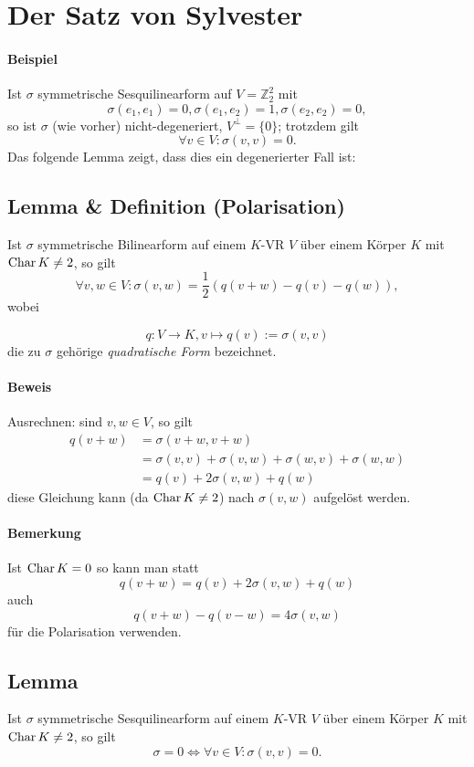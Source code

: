 \section{Der Satz von Sylvester}
\paragraph{Beispiel}
	Ist $ \sigma $ symmetrische Sesquilinearform auf $ V=\mathbb{Z}^2_2 $ mit
		\[ \sigma(e_1,e_1)=0, \sigma(e_1,e_2) = 1, \sigma(e_2,e_2) = 0, \]
	so ist $ \sigma $ (wie vorher) nicht-degeneriert, $ V^\perp =\{0\}$; trotzdem gilt
		\[ \forall v\in V: \sigma(v,v) = 0. \]
	Das folgende Lemma zeigt, dass dies ein degenerierter Fall ist:
	
\subsection{Lemma \& Definition (Polarisation)}
\begin{Lemma}[Polarisationslemma]	
	Ist $ \sigma $ symmetrische Bilinearform auf einem $ K $-VR $ V $ über einem Körper $ K $ mit $ \operatorname{Char} K \neq 2 $, so gilt
		\[ \forall v,w\in V: \sigma(v,w)=\frac{1}{2}\left(q(v+w)-q(v)-q(w)\right), \]
	wobei
\end{Lemma}
\begin{Definition}
		\[ q:V\to K, v\mapsto q(v):= \sigma(v,v) \]
	die zu $ \sigma $ gehörige \emph{quadratische Form} bezeichnet.
\end{Definition}
\paragraph{Beweis}
	Ausrechnen: sind $ v,w\in V $, so gilt
	\begin{align*}
	q(v+w) &= \sigma(v+w,v+w)\\
			&= \sigma(v,v) + \sigma(v,w)+\sigma(w,v)+\sigma(w,w)\\
			&= q(v)+2\sigma(v,w)+q(w)
	\end{align*}
	diese Gleichung kann (da $ \operatorname{Char} K\neq 2 $) nach $ \sigma(v,w) $ aufgelöst werden.
\paragraph{Bemerkung}
	Ist $ \operatorname{Char} K=0 $ so kann man statt
		\[ q(v+w)=q(v)+2\sigma(v,w)+q(w) \]
	auch
		\[ q(v+w)-q(v-w) = 4 \sigma(v,w) \]
	für die Polarisation verwenden.
	
\subsection{Lemma}
\begin{Lemma}[]
	Ist $ \sigma $ symmetrische Sesquilinearform auf einem $ K $-VR $ V $ über einem Körper $ K $ mit $ \operatorname{Char} K \neq 2 $, so gilt
		\[ \sigma = 0 \Leftrightarrow \forall v\in V: \sigma(v,v) = 0. \]
\end{Lemma}

